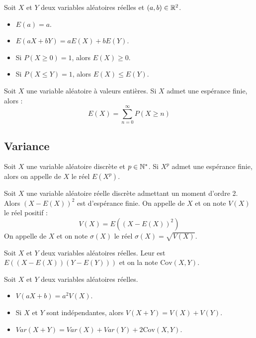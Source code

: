 \documentclass{book}
\begin{document}
\begin{Proposition}
Soit $X$ et $Y$ deux variables aléatoires réelles et $(a,b)\in\mathbb{R}^2$.
\begin{itemize}
\item
  $E(a) = a$.
\item
  $E(aX+bY) = aE(X)+bE(Y)$.
\item
  Si $P(X\geq 0)=1$, alors $E(X)\geq 0$.
\item
  Si $P(X\leq Y)=1$, alors $E(X)\leq E(Y)$.
\end{itemize}
\end{Proposition}

\begin{Proposition}
Soit $X$ une variable aléatoire à valeurs entières. Si $X$ admet une espérance finie, alors :
$$E(X ) =\sum_{n=0}^{\infty}  P(X\geq n)$$
\end{Proposition}
\subsection{Variance}
\begin{Definition}
Soit $X$ une variable aléatoire discrète et $p \in \mathbb{N}^*$. Si $X^p$
 admet une espérance finie, alors on appelle
 de $X$ le réel $E(X^p).$
\end{Definition}
\begin{Definition}
Soit $X$ une variable aléatoire réelle discrète admettant un moment
d'ordre 2. Alors $(X -E(X ))^2$ est d'espérance finie. On appelle  de $X$ et on note $V(X )$ le réel
positif :
$$V(X ) = E((X - E(X ))^2)$$
On appelle  de $X$ et on note $\sigma(X )$ le réel $\sigma(X ) = \sqrt{V(X )}$.
\end{Definition}
\begin{Definition}

Soit $X$ et $Y$ deux variables aléatoires réelles.
Leur  est $E( (X-E(X)) (Y-E(Y)) )$ et on la note $\mathrm{Cov}(X,Y)$.
\end{Definition}
\begin{Proposition}[Propriétés]

Soit $X$ et $Y$ deux variables aléatoires réelles.
\begin{itemize}
\item
  $V(aX+b) = a^2V(X)$.
\item
  Si $X$ et $Y$ sont indépendantes, alors $V(X+Y) =V(X)+V(Y)$.
\item
  $Var(X+Y) = Var(X) + Var(Y) + 2\mathrm{Cov}(X,Y)$.
\end{itemize}
\end{Proposition}
\end{document}
